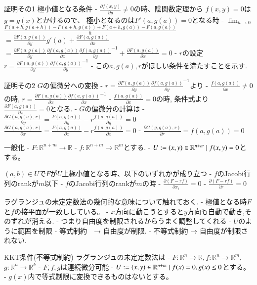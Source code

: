 \documentclass{ujarticle}
\begin{document}
証明その1 極小値となる条件
- $\frac{\partial f(x, y)}{\partial y} \neq 0$の時、陰関数定理から
  $f(x, y) = 0$は$y = g(x)$とかけるので、
  極小となるのは$F'(a, g(a)) = 0$となる時
- $\displaystyle \lim_{h \to 0}$ $\frac{F(a + h, g(a+h)) - F(a+h, g(a)) + F(a+h, g(a)) - F(a,g(a))}{h}$
  $= \frac{\partial F(a, g(a))}{\partial y} g'(a) + \frac{\partial F(a, g(a))}{\partial x}$
  $= \frac{\partial F(a, g(a))}{\partial y} \frac{\partial f(a, g(a))}{\partial x} \frac{\partial f(a, g(a))}{\partial y}^{-1} + \frac{\partial F(a, g(a))}{\partial x} = 0$
- $r$の設定
  $r= \frac{\partial F(a, g(a))}{\partial y} \frac{\partial f(a, g(a))}{\partial y}^{-1}$
- この$a, g(a), r$がほしい条件を満たすことを示す.


証明その2 $G$の偏微分への変換
- $r= \frac{\partial F(a, g(a))}{\partial y} \frac{\partial f(a, g(a))}{\partial y}^{-1}$より
  - $\frac{f(a, g(a))}{\partial x} \neq 0$の時, $r= \frac{\partial F(a, g(a))}{\partial x} \frac{\partial f(a, g(a))}{\partial x}^{-1}$
  - $\frac{f(a, g(a))}{\partial x} = 0$の時, 条件式より$\frac{\partial F(a, g(a))}{\partial x} = 0$となる.
- $G$の偏微分の計算は
  - $\frac{\partial G(a, g(a), r)}{\partial y} = \frac{F(a, g(a))}{\partial y} - r \frac{f(a, g(a))}{\partial y} = 0$
  - $\frac{\partial G(a, g(a), r)}{\partial x} = \frac{F(a, g(a))}{\partial x} - r \frac{f(a, g(a))}{\partial x} = 0$
  - $\frac{\partial G(g, g(a), r)}{\partial r} = f(a, g(a)) = 0$

一般化
- $F: \mathbb{R}^{n+m} \to \mathbb{R}$
- $f: \mathbb{R}^{n+m} \to \mathbb{R}^m$とする.
- $U := \\{ (x,y) \in \mathbb{R}^{n+m} \mid f(x,y) = 0\\}$とする。

$(a, b) \in U$で$F$が$U$上極小値となる時、以下のいずれかが成り立つ
- $f$のJacobi行列のrankが$m$以下
- $f$のJacobi行列のrankが$m$の時
  - $\frac{ \partial (F - r f)}{\partial x_i} = 0$
  - $\frac{ \partial (F - r f)}{\partial r} = 0$

ラグランジュの未定定数法の幾何的な意味について触れておく.
- 極値となる時$F$と$f$の接平面が一致ししている。
- $x$方向に動こうとすると$y$方向も自動で動き,そのずれが消える.
- つまり自由度を制限されるからうまく調整してくれる
- $U$のように範囲を制限
  - 等式制約　→ 自由度が制限.
  - 不等式制約 → 自由度が制限されない.

KKT条件(不等式制約)
ラグランジュの未定定数法は
- $F: \mathbb{R}^{n} \to \mathbb{R}, f: \mathbb{R}^{n} \to \mathbb{R}^m$, $g: \mathbb{R}^{n} \to \mathbb{R}^k$
- $F,f, g$は連続微分可能
- $U := \\{(x,y) \in \mathbb{R}^{n+m} \mid f(x) = 0, g(x) \le 0\\}$とする。
- $g(x)$内で等式制限に変換できるものはないとする。
\end{document}
